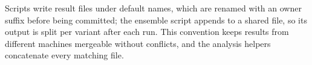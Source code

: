 Scripts write result files under default names, which are renamed with an owner suffix before being committed; the ensemble script appends to a shared file, so its output is split per variant after each run. This convention keeps results from different machines mergeable without conflicts, and the analysis helpers concatenate every matching file.
